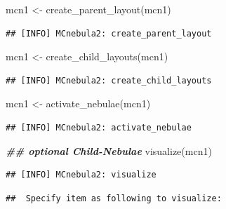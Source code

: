 \documentclass[
]{article}
\newenvironment{Shaded}{\begin{snugshade}}{\end{snugshade}}
\newcommand{\DocumentationTok}[1]{\textcolor[rgb]{0.56,0.35,0.01}{\textbf{\textit{#1}}}}
\newcommand{\FunctionTok}[1]{\textcolor[rgb]{0.00,0.00,0.00}{#1}}
\newcommand{\NormalTok}[1]{#1}
\newcommand{\OtherTok}[1]{\textcolor[rgb]{0.56,0.35,0.01}{#1}}
\begin{document}
\begin{Shaded}
\begin{Highlighting}[]
\NormalTok{mcn1 }\OtherTok{\textless{}{-}} \FunctionTok{create\_parent\_layout}\NormalTok{(mcn1)}
\end{Highlighting}
\end{Shaded}

\begin{verbatim}
## [INFO] MCnebula2: create_parent_layout
\end{verbatim}

\begin{Shaded}
\begin{Highlighting}[]
\NormalTok{mcn1 }\OtherTok{\textless{}{-}} \FunctionTok{create\_child\_layouts}\NormalTok{(mcn1)}
\end{Highlighting}
\end{Shaded}

\begin{verbatim}
## [INFO] MCnebula2: create_child_layouts
\end{verbatim}

\begin{Shaded}
\begin{Highlighting}[]
\NormalTok{mcn1 }\OtherTok{\textless{}{-}} \FunctionTok{activate\_nebulae}\NormalTok{(mcn1)}
\end{Highlighting}
\end{Shaded}

\begin{verbatim}
## [INFO] MCnebula2: activate_nebulae
\end{verbatim}

\begin{Shaded}
\begin{Highlighting}[]
\DocumentationTok{\#\# optional Child{-}Nebulae}
\FunctionTok{visualize}\NormalTok{(mcn1)}
\end{Highlighting}
\end{Shaded}

\begin{verbatim}
## [INFO] MCnebula2: visualize
\end{verbatim}

\begin{verbatim}
##  Specify item as following to visualize:
\end{verbatim}
\end{document}
